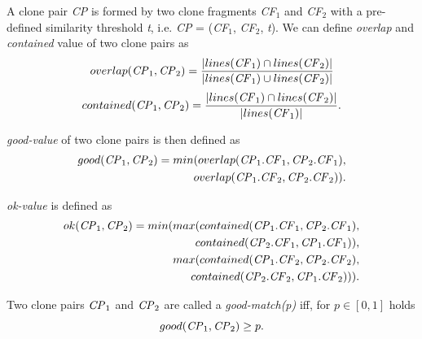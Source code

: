 \documentclass{sig-alternate-05-2015}
\newcommand{\squeezeup}{\vspace{-0.5mm}}
\begin{document}
A clone pair \textit{CP} is formed by two clone fragments \textit{CF$_1$} and \textit{CF$_2$} with a pre-defined similarity threshold \textit{t}, i.e. \textit{CP} = (\textit{CF$_1$}, \textit{CF$_2$}, \textit{t}).  We can define \textit{overlap} and \textit{contained} value of two clone pairs as 
\begin{multline}
	overlap(\textrm{\textit{CP}}_1, \textrm{\textit{CP}}_2) = \frac{|lines(\textrm{\textit{CF}}_1) \cap lines(\textrm{\textit{CF}}_2)|}{|lines(\textrm{\textit{CF}}_1) \cup lines(\textrm{\textit{CF}}_2)|} 
\end{multline}
\begin{multline}
	contained(\textrm{\textit{CP}}_1, \textrm{\textit{CP}}_2) = \frac{|lines(\textrm{\textit{CF}}_1) \cap lines(\textrm{\textit{CF}}_2)|}{|lines(\textrm{\textit{CF}}_1)|}. 
\end{multline}

\textit{good-value} of two clone pairs is then defined as
\begin{align*}
	good(\textrm{\textit{CP}}_1, \textrm{\textit{CP}}_2) = min(overlap(\textrm{\textit{CP}}_1.\textrm{\textit{CF}}_1,\textrm{\textit{CP}}_2.\textrm{\textit{CF}}_1), \\ overlap(\textrm{\textit{CP}}_1.\textrm{\textit{CF}}_2,\textrm{\textit{CP}}_2.\textrm{\textit{CF}}_2)).
\end{align*}

\textit{ok-value} is defined as
\begin{align*}
	ok(\textrm{\textit{CP}}_1,\textrm{\textit{CP}}_2) = min(max(contained(\textrm{\textit{CP}}_1.\textrm{\textit{CF}}_1,\textrm{\textit{CP}}_2.\textrm{\textit{CF}}_1), \\ contained(\textrm{\textit{CP}}_2.\textrm{\textit{CF}}_1,\textrm{\textit{CP}}_1.\textrm{\textit{CF}}_1)),
	\\ max(contained(\textrm{\textit{CP}}_1.\textrm{\textit{CF}}_2,\textrm{\textit{CP}}_2.\textrm{\textit{CF}}_2), \\contained(\textrm{\textit{CP}}_2.\textrm{\textit{CF}}_2,\textrm{\textit{CP}}_1.\textrm{\textit{CF}}_2))).
\end{align*}

Two clone pairs $\textrm{\textit{CP}}_1$ and $\textrm{\textit{CP}}_2$ are called a \textit{good-match(p)} iff, for $p \in [0,1]$ holds 
\begin{equation}
good(\textrm{\textit{CP}}_1,\textrm{\textit{CP}}_2) \geq p.
\end{equation}
\end{document}
